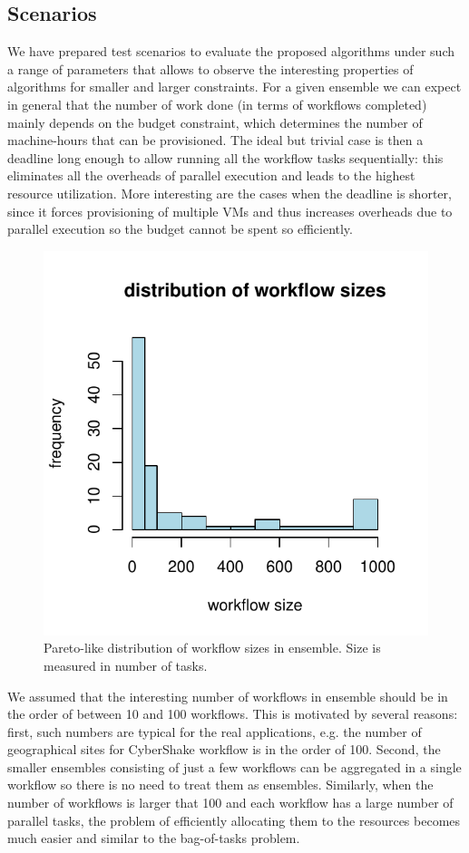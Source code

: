 \documentclass{sig-alternate}
\begin{document}
\subsection{Scenarios}
\label{sec:scenarios}

We have prepared test scenarios to evaluate the proposed algorithms under
such a range of parameters that allows to observe the interesting properties of
algorithms for smaller and larger constraints. For a given ensemble we can
expect in general that the number of work done (in terms of workflows completed)
mainly depends on the budget constraint, which determines the number of
machine-hours that can be provisioned. The ideal but trivial case is then a
deadline long enough to allow running all the workflow tasks sequentially: this
eliminates all the overheads of parallel execution and leads to the highest
resource utilization. More interesting are the cases when the deadline is
shorter, since it forces provisioning of multiple VMs and thus increases
overheads due to parallel execution so the budget cannot be spent so
efficiently.

\begin{figure}[tb] 
\centering
\includegraphics[width=0.6\columnwidth]{figures/ensemble-pareto}
\caption{Pareto-like distribution of workflow sizes in ensemble. Size is
measured in number of tasks.}
\label{fig:ensemble-distribution}
\end{figure}



We assumed that the interesting number of workflows in ensemble should be in the
order of between 10 and 100 workflows. This is motivated by several reasons:
first, such numbers are typical for the real applications, e.g. the number of geographical sites for
CyberShake workflow is in the order of 100. Second, the smaller ensembles
consisting of just a few workflows can be aggregated in a single workflow so
there is no need to treat them as ensembles. Similarly, when the number of
workflows is larger that 100 and each workflow has a large number of parallel
tasks, the problem of efficiently allocating them to the resources becomes much
easier and similar to the bag-of-tasks problem.
\end{document}
